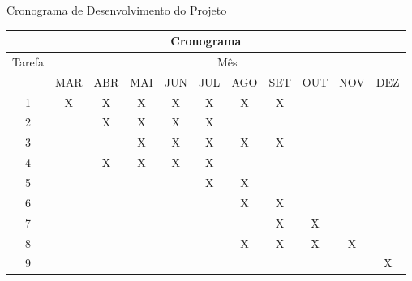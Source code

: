 \begin{quadro}[!htb]
	\centering
	\caption{Cronograma de Desenvolvimento do Projeto\label{qua:cronograma}}
	\begin{tabular}{|c|cccccccccc|}
		\hline
		\multicolumn{11}{|c|}{\textbf{Cronograma}} \\
		\hline
		\multirow{2}{*}{Tarefa} & \multicolumn{10}{c|}{Mês} \\ \cline{2-11}
		& MAR & ABR & MAI & JUN & JUL & AGO & SET & OUT & NOV & DEZ \\
		\hline
		1 & X & X & X & X & X & X & X &&& \\
		2 & & X & X & X & X &&&&& \\
		3 &&& X & X & X & X & X &&& \\
		4 & & X & X & X & X &&&&& \\
		5 & & & & & X & X &&&& \\
		6 & & & & & & X & X &&& \\
		7 & & & & & & & X & X && \\
		8 & & & & & & X & X & X & X & \\
		9 &&&&&&&&&& X \\
		\hline
	\end{tabular}
\end{quadro}

